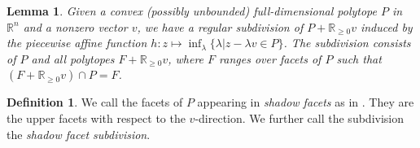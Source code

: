 \documentclass[12pt]{amsart}
\newcommand{\mb}{\mathbb}
\theoremstyle{plain}
\newtheorem{Lem}[Thm]{Lemma}
\theoremstyle{definition}
\newtheorem{Def}{Definition}[section]
\theoremstyle{remark}
\begin{document}
\begin{Lem}
\label{finksub}
Given a convex (possibly unbounded) full-dimensional polytope $P$ in $\mb{R}^n$ and a nonzero vector $v$, we have a regular subdivision of $P+\mb{R}_{\ge 0}v$ induced by the piecewise affine function $h: z \mapsto \inf_\lambda \{\lambda | z-\lambda v \in P\}$. The subdivision consists of $P$ and all polytopes $F+\mb{R}_{\ge 0}v$, where $F$ ranges over facets of $P$ such that $(F+\mb{R}_{\ge 0}v)\cap P=F$.
\end{Lem}

\begin{Def}
We call the facets of $P$ appearing in  \emph{shadow facets} as in \cite[Appendix A]{Derksen}. They are the upper facets with respect to the $v$-direction. We further call the subdivision the \emph{shadow facet subdivision}.
\end{Def}
\end{document}

